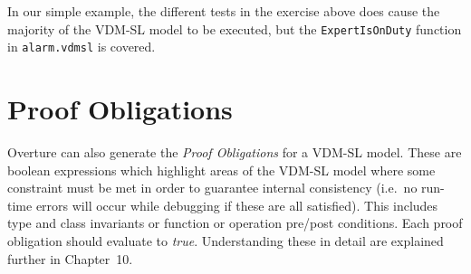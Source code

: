 {In our simple example, the different tests in the exercise above does cause the majority of
the VDM-SL model to be executed, but the \verb|ExpertIsOnDuty|
function in \verb|alarm.vdmsl| is covered. 



\section{Proof Obligations}\label{sec:POtool}

Overture can also generate the \emph{Proof Obligations} for a VDM-SL
model. These are boolean expressions which highlight areas of the
VDM-SL model where some constraint must be met in order to guarantee
internal consistency (i.e.\ no run-time errors will occur while
debugging if these are all satisfied). This includes type and class
invariants or function or operation pre/post conditions. Each proof
obligation should evaluate to \emph{true}. Understanding these in
detail are explained further in Chapter~10.

}
